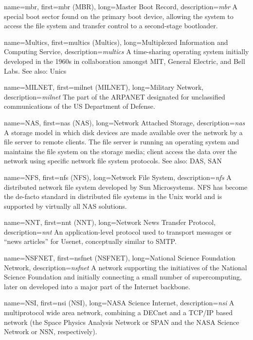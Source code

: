 {
	name={mbr},
	first={\acrlong{mbr} (MBR)},
	long={Master Boot Record},
	description={{\em \acrlong{mbr}} A special
boot sector found on the primary boot device, allowing
the system to access the file system and transfer
control to a second-stage bootloader.}
}


{
	name={Multics},
	first={\acrlong{multics} (Multics)},
	long={Multiplexed Information and Computing Service},
	description={{\em \acrlong{multics}} A time-sharing operating system
initially developed in the 1960s in collaboration amongst MIT, General Electric,
and Bell Labs. See also: Unics}
}

{
	name={MILNET},
	first={\acrlong{milnet} (MILNET)},
	long={Military Network},
	description={{\em \acrlong{milnet}} The part of the ARPANET designated
for unclassified communications of the US Department
of Defense.}
}

{
	name={NAS},
	first={\acrlong{nas} (NAS)},
	long={Network Attached Storage},
	description={{\em \acrlong{nas}} A storage model in which disk
devices are made available over the network by a file server to remote
clients.  The file server is running an operating system and maintains the
file system on the storage media; client access the data over the network
using specific network file system protocols.  See
also: DAS, SAN}
}

{
	name={NFS},
	first={\acrlong{nfs} (NFS)},
	long={Network File System},
	description={{\em \acrlong{nfs}} A distributed network file system
developed by Sun Microsystems.  NFS has become the de-facto standard in
distributed file systems in the Unix world and is supported by virtually
all NAS solutions.}
}

{
	name={NNT},
	first={\acrlong{nnt} (NNT)},
	long={Network News Transfer Protocol},
	description={{\em \acrlong{nnt}} An application-level
protocol used to transport messages or ``news articles'' for Usenet,
conceptually similar to SMTP.}
}

{
	name={NSFNET},
	first={\acrlong{nsfnet} (NSFNET)},
	long={National Science Foundation Network},
	description={{\em \acrlong{nsfnet}} A network
supporting the initiatives of the National Science Foundation and
initially connecting a small number of supercomputing, later on developed
into a major part of the Internet backbone.}
}

{
	name={NSI},
	first={\acrlong{nsi} (NSI)},
	long={NASA Science Internet},
	description={{\em \acrlong{nsi}} A multiprotocol wide area network,
combining a DECnet and a TCP/IP based network (the Space Physics Analysis
Network or SPAN and the NASA Science Network or NSN,
respectively).}
}

